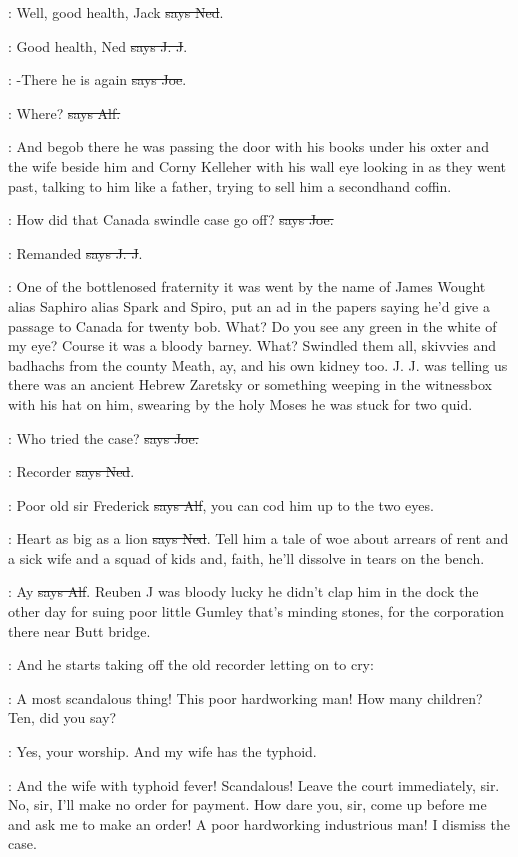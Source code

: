 \lambert:
Well, good health, Jack \sout{says Ned}.

\jjom:
Good health, Ned \sout{says J. J}.

\joe:
-There he is again \sout{says Joe}.

\bergan:
Where? \sout{says Alf.}

\Nq:
And begob there he was
passing the door with his books under his
oxter and the wife beside him and Corny Kelleher with his wall eye looking
in as they went past, talking to him like a father, trying to sell him a
secondhand coffin.

\joe:
How did that Canada swindle case go off? \sout{says Joe.}

\jjom:
Remanded \sout{says J. J}.

\Nq:
One of the bottlenosed fraternity it was went by the name of James
Wought alias Saphiro alias Spark and Spiro, put an ad in the papers saying
he'd give a passage to Canada for twenty bob. What? Do you see any green
in the white of my eye? Course it was a bloody barney. What? Swindled
them all, skivvies and badhachs from the county Meath,
ay, and his own
kidney too. J. J. was telling us there was an ancient Hebrew Zaretsky or
something weeping in the witnessbox with his hat on him, swearing by the
holy Moses he was stuck for two quid.

\joe:
Who tried the case? \sout{says Joe.}

\lambert:
Recorder \sout{says Ned}.

\bergan:
Poor old sir Frederick \sout{says Alf},
you can cod him up to the two eyes.

\lambert:
Heart as big as a lion \sout{says Ned}.
Tell him a tale of woe about arrears
of rent and a sick wife and a squad of kids and, faith, he'll dissolve in
tears on the bench.

\bergan:
Ay \sout{says Alf}.
Reuben J was bloody lucky he didn't clap him in the dock
the other day for suing poor little Gumley that's minding stones, for the
corporation there near Butt bridge.

\Nq:
And he starts taking off the old recorder letting on to cry:

\bergan:
A most scandalous thing! This poor hardworking man! How many
children? Ten, did you say?

\bergan:
Yes, your worship. And my wife has the typhoid.

\bergan:
And the wife with typhoid fever! Scandalous! Leave the court
immediately, sir. No, sir, I'll make no order for payment. How dare you,
sir, come up before me and ask me to make an order! A poor hardworking
industrious man!
I dismiss the case.

